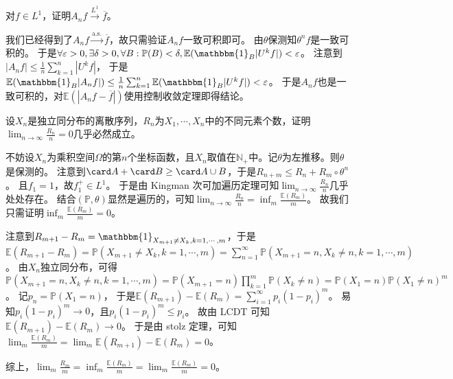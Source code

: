 \documentclass{ctexart}
\begin{document}
\begin{problem}\label{pro:2}
  对\(f \in L^1 \)，证明\(A_n f \overset{L^1}{\to} \overline{f} \)。
\end{problem}
\begin{solution}
  我们已经得到了\(A_n f \overset{\mathrm{a.s.}}{\to} \overline{f} \)，故只需验证\(A_n f \)一致可积即可。
  由\(\theta \)保测知\(\theta^n f \)是一致可积的。
  于是\(\forall \varepsilon>0,\exists \delta>0,\forall B:\mathbb{P}(B)<\delta,\mathbb{E}(\mathbbm{1}_B |U^k f|)<\varepsilon\)。
  注意到\(|A_n f| \leq \frac{1}{n} \sum_{k=1}^{n}|U^k f| \)，
  于是\(\mathbb{E}(\mathbbm{1}_B |A_n f|) \leq \frac{1}{n}\sum_{k=1}^{n}\mathbb{E}(\mathbbm{1}_B |U^k f|)<\varepsilon \)。
  于是\(A_n f \)也是一致可积的，对\(\mathbb{E}(|A_n f - \overline{f}|) \)使用控制收敛定理即得结论。
\end{solution}
\begin{problem}\label{pro:3}
  设\(X_n \)是独立同分布的离散序列，\(R_n \)为\(X_{1},\cdots,X_{n} \)中的不同元素个数，证明\(\lim_{n \to \infty}\frac{R_n}{n} = 0 \)几乎必然成立。
\end{problem}
\begin{solution}
  不妨设\(X_n \)为乘积空间\(\Omega \)的第\(n \)个坐标函数，且\(X_n \)取值在\(\mathbb{N}_+ \)中。记\(\theta \)为左推移。则\(\theta \)是保测的。
  注意到\(\card A + \card B \geq \card A \cup B \)，于是\(R_{n + m} \leq R_n + R_m \circ \theta^n \)。
  且\(f_1=1 \)，故\(f_{1}^+ \in L^1 \)。
  于是由 Kingman 次可加遍历定理可知\(\lim_{n \to \infty}\frac{R_n}{n} \)几乎处处存在。
  结合\((\mathbb{P},\theta) \)显然是遍历的，可知\(\lim_{n \to \infty}\frac{R_n}{n}=\inf_{m}\frac{\mathbb{E}(R_m)}{m} \)。
  故我们只需证明\(\inf_{m}\frac{\mathbb{E}(R_m)}{m} = 0 \)。

  注意到\(R_{m + 1} - R_{m} = \mathbbm{1}_{X_{m + 1} \neq X_k,k=1,\cdots,m}\)，于是\(\mathbb{E}(R_{m + 1}- R_m) = \mathbb{P}(X_{m + 1} \neq X_k,k=1,\cdots,m)=\sum_{n=1}^{\infty}\mathbb{P}(X_{m+1}=n,X_k \neq n,k=1,\cdots,m) \)。
  由\(X_n \)独立同分布，可得\(\mathbb{P}(X_{m + 1}= n,X_k \neq n,k=1,\cdots,m) = \mathbb{P}(X_{m + 1}=n) \prod_{k=1}^{m}\mathbb{P}(X_k \neq n) = \mathbb{P}(X_1 = n)\mathbb{P}(X_1 \neq n)^m\)。
  记\(p_n = \mathbb{P}(X_{1} = n) \)，
  于是\(\mathbb{E}(R_{m + 1})-\mathbb{E}(R_m) = \sum_{i = 1}^{\infty}p_i(1-p_i)^m \)。
  易知\(p_i(1-p_i)^m \to 0 \)，且\(p_i(1-p_i)^m \leq p_i \)。
  故由 LCDT 可知\(\mathbb{E}(R_{m + 1})- \mathbb{E}(R_m) \to 0 \)。
  于是由 stolz 定理，可知\(\lim_{m}\frac{\mathbb{E}(R_m)}{m} = \lim_{m} \mathbb{E}(R_{m + 1})- \mathbb{E}(R_m) = 0 \)。

  综上，\(\lim_{m} \frac{R_m}{m} = \inf_{m} \frac{\mathbb{E}(R_m)}{m} = \lim_{m} \frac{\mathbb{E}(R_m)}{m} = 0 \)。
\end{solution}
\end{document}
